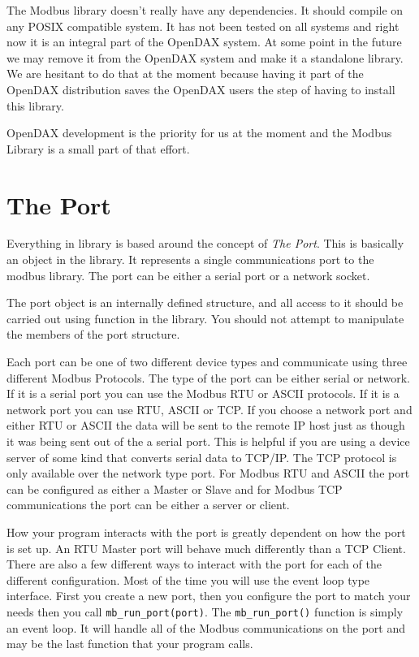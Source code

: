 The Modbus library doesn't really have any dependencies.  It should compile on any POSIX compatible system.  It has not been tested on all systems and right now it is an integral part of the OpenDAX system.  At some point in the future we may remove it from the OpenDAX system and make it a standalone library.  We are hesitant to do that at the moment because having it part of the OpenDAX distribution saves the OpenDAX users the step of having to install this library.

OpenDAX development is the priority for us at the moment and the Modbus Library is a small part of that effort.

\section{The Port}
Everything in library is based around the concept of \textit{The Port}.  This is basically an object in the library.  It represents a single communications port to the modbus library.  The port can be either a serial port or a network socket.

The port object is an internally defined structure, and all access to it should be carried out using function in the library.  You should not attempt to manipulate the members of the port structure.

Each port can be one of two different device types and communicate using three different Modbus Protocols. The type of the port can be either serial or network.  If it is a serial port you can use the Modbus RTU or ASCII protocols.  If it is a network port you can use RTU, ASCII or TCP.  If you choose a network port and either RTU or ASCII the data will be sent to the remote IP host just as though it was being sent out of the a serial port.  This is helpful if you are using a device server of some kind that converts serial data to TCP/IP.  The TCP protocol is only available over the network type port.  For Modbus RTU and ASCII the port can be configured as either a Master or Slave and for Modbus TCP communications the port can be either a server or client.

How your program interacts with the port is greatly dependent on how the port is set up.  An RTU Master port will behave much differently than a TCP Client.  There are also a few different ways to interact with the port for each of the different configuration.  Most of the time you will use the event loop type interface.  First you create a new port, then you configure the port to match your needs then you call \texttt{mb\_run\_port(port)}.  The \texttt{mb\_run\_port()} function is simply an event loop.  It will handle all of the Modbus communications on the port and may be the last function that your program calls.

